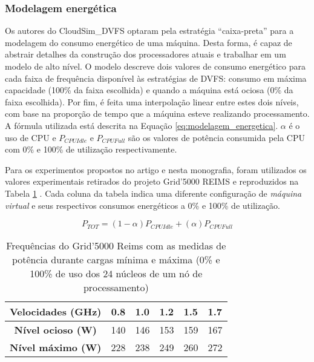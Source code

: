 \subsubsection{Modelagem energética} %
\label{ssub:modelagem_energetica}

Os autores do CloudSim\_DVFS optaram pela estratégia ``caixa-preta'' para a
modelagem do consumo energético de uma máquina. Desta forma, é capaz de abstrair
detalhes da construção dos processadores atuais e trabalhar em um modelo de alto
nível. O modelo descreve dois valores de consumo energético para cada faixa de
frequência disponível às estratégias de DVFS: consumo em máxima capacidade
(100\% da faixa escolhida) e quando a máquina está ociosa (0\%  da faixa
escolhida). Por fim, é feita uma interpolação linear entre estes dois níveis,
com base na proporção de tempo que a máquina esteve realizando processamento. A
fórmula utilizada está descrita na Equação \ref{eq:modelagem_energetica}.
$\alpha$ é o uso de CPU e $P_{CPUIdle}$ e $P_{CPUFull}$ são os valores de
potência consumida pela CPU com 0\% e 100\% de utilização respectivamente.

Para os experimentos propostos no artigo e nesta monografia, foram utilizados os
valores experimentais retirados do projeto Grid'5000 REIMS e reproduzidos na
Tabela \ref{tab:modelo_grid_5000} \cite{cappello:grid5000}
\cite{guerout:energy_aware_simulation}. Cada coluna da tabela indica uma
diferente configuração de \emph{máquina virtual} e seus respectivos consumos
energéticos a 0\% e 100\% de utilização.

\begin{equation}
P_{TOT} = (1 - \alpha)P_{CPUIdle} + (\alpha)P_{CPUFull} \label{eq:modelagem_energetica}  
\end{equation}

\begin{table}
    \centering
    \begin{tabular}{c|cllll}
    \hline
    \textbf{Velocidades (GHz)} & \textbf{0.8} & \textbf{1.0} & \textbf{1.2} & \textbf{1.5} & \textbf{1.7} \\ \hline
    \textbf{Nível ocioso (W)}       & 140          & 146          & 153          & 159          & 167          \\
    \textbf{Nível máximo (W)}  & 228          & 238          & 249          & 260          & 272          \\ \hline
    \end{tabular}
    \caption{Frequências do Grid'5000 Reims com as medidas de potência durante
    cargas mínima e máxima (0\% e 100\% de uso dos 24 núcleos de um nó de processamento)
    }
    \label{tab:modelo_grid_5000}
\end{table}


